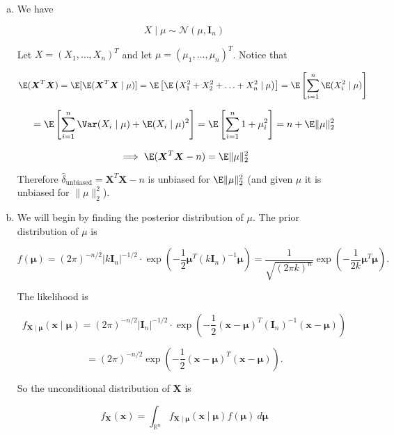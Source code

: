 \begin{solution}

\begin{enumerate}[(a)]

\item We have

\[
X \mid \mu \sim \mathcal{N}(\mu, \boldsymbol{I}_n)
\]

Let \(X = (X_1, \ldots, X_n)^T\) and let \(\mu = (\mu_1, \ldots, \mu_n)^T\). Notice that

\[
\E(\boldsymbol{X}^T\boldsymbol{X}) = \E[ \E(\boldsymbol{X}^T\boldsymbol{X} \mid \mu)] =  \E \left[ \E \left( X_1^2 + X_2^2 + \ldots + X_n^2 \mid \mu \right)  \right] = \E \left[ \sum_{i=1}^n \E (X_i^2 \mid \mu )  \right] 
\]

\[
= \E \left[ \sum_{i=1}^n \Var(X_i \mid \mu) + \E(X_i \mid \mu)^2  \right]  =  \E \left[ \sum_{i=1}^n 1+ \mu_i^2 \right] = n + \E \lVert \mu \rVert_2^2 
\]

\[
\implies \E(\boldsymbol{X}^T\boldsymbol{X} - n) =  \E \lVert \mu \rVert_2^2 
\]

Therefore \(\boxed{ \hat{\delta}_{\text{unbiased}} = \boldsymbol{X}^T\boldsymbol{X} - n}\) is unbiased for \(\E \lVert \mu \rVert_2^2\) (and given \(\mu\) it is unbiased for \(\lVert \mu \rVert_2^2\)).

\item We will begin by finding the posterior distribution of \(\mu\). The prior distribution of \(\mu\) is

\[
f(\boldsymbol{\mu}) = (2 \pi)^{-n/2} | k\boldsymbol{I}_n|^{-1/2} \cdot \exp \left(- \frac{1}{2} \boldsymbol{\mu} ^T ( k\boldsymbol{I}_n)^{-1} \boldsymbol{\mu} \right) = \frac{1}{\sqrt{(2 \pi k)^n}} \exp \left(- \frac{1}{2k}\boldsymbol{\mu} ^T  \boldsymbol{\mu} \right).
\]


The likelihood is

\[
f_{\boldsymbol{X} \mid \boldsymbol{\mu}}(\boldsymbol{x} \mid \boldsymbol{\mu}) = (2 \pi)^{-n/2} | \boldsymbol{I}_n|^{-1/2} \cdot \exp \left(- \frac{1}{2}(\boldsymbol{x} - \boldsymbol{\mu}) ^T ( \boldsymbol{I}_n)^{-1} (\boldsymbol{x} - \boldsymbol{\mu} ) \right)
\]

\[
= (2 \pi)^{-n/2} \exp \left(- \frac{1}{2}(\boldsymbol{x} - \boldsymbol{\mu}) ^T  (\boldsymbol{x} - \boldsymbol{\mu} ) \right).
\]

So the unconditional distribution of \(\boldsymbol{X}\) is

\[
f_{\boldsymbol{X}}(\boldsymbol{x})  = \int_{\mathbb{R}^n} f_{\boldsymbol{X} \mid \boldsymbol{\mu}}(\boldsymbol{x} \mid \boldsymbol{\mu}) f(\boldsymbol{\mu}) \ d \boldsymbol{\mu} 
\]


\end{enumerate}
\end{solution}
